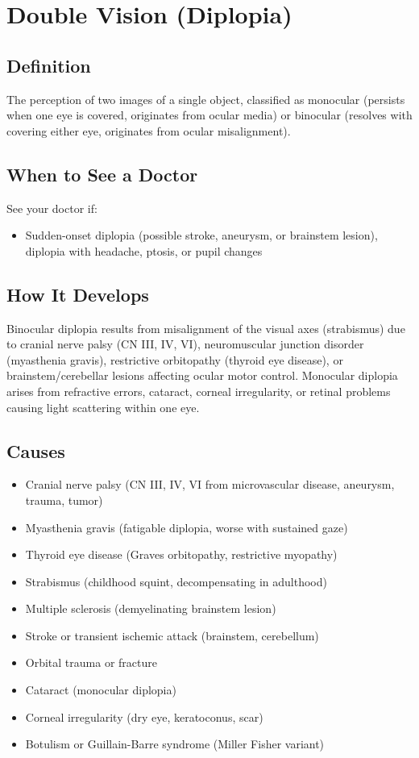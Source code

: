 \chapter{Double Vision (Diplopia)}

\section*{Definition}
The perception of two images of a single object, classified as monocular (persists when one eye is covered, originates from ocular media) or binocular (resolves with covering either eye, originates from ocular misalignment).

\section*{When to See a Doctor}
See your doctor if:
\begin{itemize}
  \item Sudden-onset diplopia (possible stroke, aneurysm, or brainstem lesion), diplopia with headache, ptosis, or pupil changes
\end{itemize}

\section*{How It Develops}
Binocular diplopia results from misalignment of the visual axes (strabismus) due to cranial nerve palsy (CN III, IV, VI), neuromuscular junction disorder (myasthenia gravis), restrictive orbitopathy (thyroid eye disease), or brainstem/cerebellar lesions affecting ocular motor control. Monocular diplopia arises from refractive errors, cataract, corneal irregularity, or retinal problems causing light scattering within one eye.

\section*{Causes}
\begin{itemize}
  \item Cranial nerve palsy (CN III, IV, VI from microvascular disease, aneurysm, trauma, tumor)
  \item Myasthenia gravis (fatigable diplopia, worse with sustained gaze)
  \item Thyroid eye disease (Graves orbitopathy, restrictive myopathy)
  \item Strabismus (childhood squint, decompensating in adulthood)
  \item Multiple sclerosis (demyelinating brainstem lesion)
  \item Stroke or transient ischemic attack (brainstem, cerebellum)
  \item Orbital trauma or fracture
  \item Cataract (monocular diplopia)
  \item Corneal irregularity (dry eye, keratoconus, scar)
  \item Botulism or Guillain-Barre syndrome (Miller Fisher variant)
\end{itemize}

